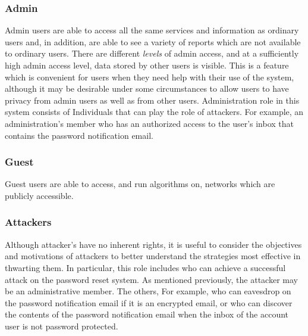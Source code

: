 \subsubsection{Admin}
Admin users are able to access all the same services and information as
ordinary users and, in addition, are able to see a variety of reports
which are not available to ordinary users. There are different {\em
levels} of admin access, and at a sufficiently high admin access level,
data stored by other users is visible. This is a feature which is
convenient for users when they need help with their use of the system,
although it may be desirable under some circumstances to allow users to
have privacy from admin users as well as from other users. Administration
role in this system consists of Individuals that can play the role of
attackers. For example, an administration's member who has an authorized
access to the user's inbox that contains the password notification email.


\subsubsection{Guest}
Guest users are able to access, and run algorithms on, networks which are publicly accessible.

\subsubsection{Attackers} 
Although attacker's have no inherent rights, it is useful to consider
the objectives and motivations of attackers to better understand the
strategies most effective in thwarting them. In particular, this role
includes who can achieve a successful attack on the password reset
system. As mentioned previously, the attacker may be an administrative
member. The others, For example, who can eavesdrop on the password
notification email  if it is an encrypted email, or who  can   discover
the contents of the password notification email  when the inbox of the
account user is not password protected.

